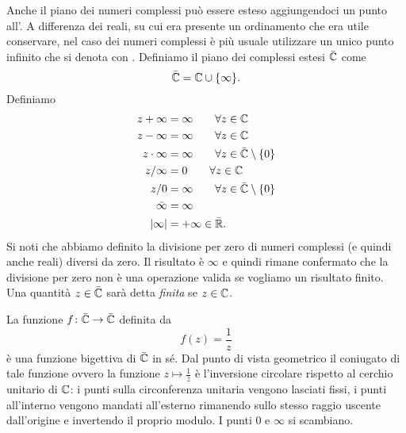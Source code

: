 Anche il piano dei numeri complessi può essere esteso aggiungendoci
un punto all'.
A differenza dei reali, su cui era presente un ordinamento che era utile conservare,
nel caso dei numeri complessi è più usuale utilizzare un unico punto infinito
che si denota con \myemph{$\infty$}.
Definiamo il piano dei complessi estesi $\bar {{\mathbb C}}$ come
\[
\bar {{\mathbb C}} = {\mathbb C} \cup {\left\{ \infty \right\}}.
\]
Definiamo
\begin{align*}
  z + \infty &= \infty \qquad \forall z \in {\mathbb C}\\
  z - \infty &= \infty \qquad \forall z \in {\mathbb C}\\
   z\cdot \infty &= \infty \qquad \forall z \in \bar{{\mathbb C}}\setminus{\left\{ 0 \right\}} \\
   z / \infty &= 0 \qquad \forall z \in {\mathbb C} \\
   z / 0 &= \infty \qquad \forall z \in \bar {{\mathbb C}} \setminus{\left\{ 0 \right\}}\\
   \bar \infty &= \infty \\
   {\left|\infty\right|} &= +\infty \in \bar {{\mathbb R}}.
\end{align*}
Si noti che abbiamo definito la divisione per zero di numeri complessi
(e quindi anche reali) diversi da zero. Il risultato è $\infty$ e quindi
rimane confermato che la divisione per zero non è una operazione valida
se vogliamo un risultato finito.
Una quantità $z\in \bar {{\mathbb C}}$ sarà detta \emph{finita} se $z\in {\mathbb C}$.

\begin{example}
  La funzione $f\colon \bar {{\mathbb C}} \to \bar {{\mathbb C}}$ 
  definita da 
  \[
  f(z) = \frac{1}{z}
  \]
  è una funzione bigettiva di $\bar {{\mathbb C}}$ in sé.
  Dal punto di vista geometrico il coniugato di tale funzione
  ovvero la funzione $z\mapsto \frac 1 {\bar z}$ 
  è l'inversione circolare rispetto al cerchio unitario di ${\mathbb C}$:
  i punti sulla circonferenza unitaria vengono lasciati fissi,
  i punti all'interno vengono mandati all'esterno rimanendo sullo 
  stesso raggio uscente dall'origine e invertendo il proprio modulo.
  I punti $0$ e $\infty$ si scambiano.
\end{example}



